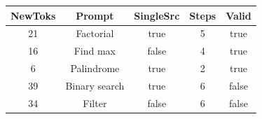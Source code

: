\begin{table}[h]
\centering
\begin{tabular}{ |c|c|c|c|c| }
\hline
NewToks & Prompt & SingleSrc & Steps & Valid \\
\hline
21 & Factorial & true & 5 & true \\
\hline
16 & Find max & false & 4 & true \\
\hline
6 & Palindrome & true & 2 & true \\
\hline
39 & Binary search & true & 6 & false \\
\hline
34 & Filter & false & 6 & false \\
\hline
\end{tabular}
\end{table}
